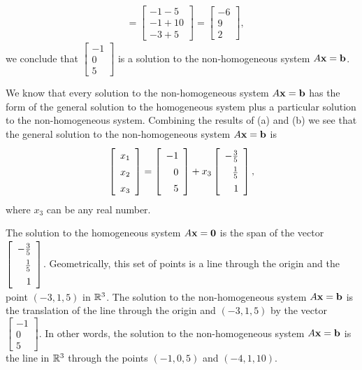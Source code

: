 \begin{example}
\begin{align*}
	&= \left[ \begin{array}{c} -1-5\\-1+10\\-3+5 \end{array} \right] = \left[ \begin{array}{r} -6\\9\\2 \end{array} \right],
\end{align*}
we conclude that $\left[ \begin{array}{r} -1\\0\\5 \end{array} \right]$ is a solution to the non-homogeneous system $A \mathbf{x} = \mathbf{b}$.

\item We know that every solution to the non-homogeneous system $A \mathbf{x} = \mathbf{b}$ has the form of the general solution to the homogeneous system plus a particular solution to the non-homogeneous system. Combining the results of (a) and (b) we see that the general solution to the non-homogeneous system $A \mathbf{x} = \mathbf{b}$ is
\[\left[\begin{array}{c} x_1\\x_2\\x_3 \end{array} \right] = \left[\begin{array}{r} -1\\0\\5 \end{array} \right]  +  x_3 \left[\renewcommand{\arraystretch}{1.4} \begin{array}{r} -\frac{3}{5}\\ \frac{1}{5}\\1 \end{array} \right],\]
where $x_3$ can be any real number. 

\item The solution to the homogeneous system $A \mathbf{x} = \mathbf{0}$ is the span of the vector $\left[\renewcommand{\arraystretch}{1.4} \begin{array}{r} -\frac{3}{5}\\ \frac{1}{5}\\1 \end{array} \right]$. Geometrically, this set of points is a line through the origin and the point $(-3, 1, 5)$ in $\mathbb{R}^3$. The solution to the non-homogeneous system $A \mathbf{x} = \mathbf{b}$ is the translation of the line through the origin and $(-3, 1, 5)$ by the vector $\left[ \begin{array}{r} -1\\0\\5 \end{array} \right]$. In other words, the solution to the non-homogeneous system $A \mathbf{x} = \mathbf{b}$ is the line in $\mathbb{R}^3 $ through the points $(-1,0,5)$ and $(-4,1,10)$. 

\ea

\end{example}

